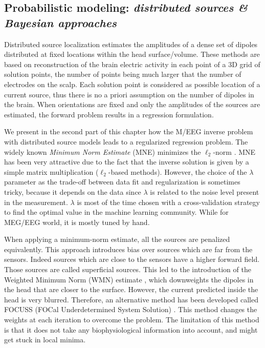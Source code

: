 \subsection{Probabilistic modeling: \textit{distributed sources \& Bayesian approaches}} \label{section_distributed}
Distributed source localization estimates the amplitudes of a dense set of dipoles distributed at fixed locations within the head surface/volume. These methods are based on reconstruction of the brain electric activity in each point of a 3D grid of solution points, the number of points being much larger that the number of electrodes on the scalp. Each solution point is considered as possible location of a current source, thus there is no a priori assumption on the number of dipoles in the brain.
When orientations are fixed and only the amplitudes of the sources are estimated, the forward problem results in a regression formulation.%

We present in the second part of this chapter how the M/EEG inverse problem with distributed source models leads to a regularized regression problem. The widely known \textit{Minimum Norm Estimate} (MNE) minimizes the $\ell_2$-norm \cite{hamalainen1994interpreting}. %
MNE has been very attractive due to the fact that the inverse solution is given by a simple matrix multiplication ($\ell_2$-based methods). However, the choice of the $\lambda$ parameter as the trade-off between data fit and regularization is sometimes tricky, because it depends on the data since $\lambda$ is related to the noise level present in the measurement. $\lambda$ is most of the time chosen with a cross-validation strategy to find the optimal value in the machine learning community. While for MEG/EEG world, it is mostly tuned by hand.

When applying a minimum-norm estimate, all the sources are penalized equivalently. This approach introduces bias over sources which are far from the sensors. Indeed sources which are close to the sensors have a higher forward field. Those sources are called superficial sources. This led to the introduction of the Weighted Minimum Norm (WMN) estimate \cite{lin2006assessing}, which downweights the dipoles in the head that are closer to the surface. However, the current predicted inside the head is very blurred. Therefore, an alternative method has been developed called FOCUSS (FOCal Underdetermined System Solution) \cite{gorodnitsky1995neuromagnetic}. This method changes the weights at each iteration to overcome the problem. The limitation of this method is that it does not take any biophysiological information into account, and might get stuck in local minima.

